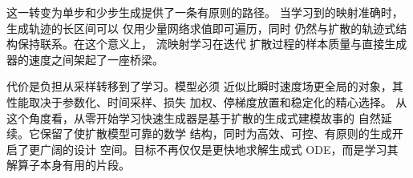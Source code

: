 这一转变为单步和少步生成提供了一条有原则的路径。
当学习到的映射准确时，生成轨迹的长区间可以
仅用少量网络求值即可遍历，同时
仍然与扩散的轨迹式结构保持联系。在这个意义上，
流映射学习在迭代
扩散过程的样本质量与直接生成器的速度之间架起了一座桥梁。

代价是负担从采样转移到了学习。模型必须
近似比瞬时速度场更全局的对象，其
性能取决于参数化、时间采样、损失
加权、停梯度放置和稳定化的精心选择。
从这个角度看，从零开始学习快速生成器是基于扩散的生成式建模故事的
自然延续。它保留了使扩散模型可靠的数学
结构，同时为高效、可控、有原则的生成开启了更广阔的设计
空间。目标不再仅仅是更快地求解生成式 ODE，而是学习其
解算子本身有用的片段。








